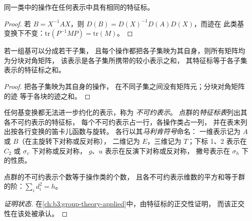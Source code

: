 \begin{proposition}[特征标是类函数]\label{prop:b3:point-groups:class-characters}
同一类中的操作在任何表示中具有相同的特征标。
\end{proposition}

\begin{proof}
若 $B = X^{-1}AX$，则 $D(B) = D(X)^{-1}D(A)D(X)$，而迹在
此类基变换下不变：$\mathrm{tr}(P^{-1}MP) = \mathrm{tr}(M)$。
\end{proof}

\begin{proposition}[按块约化]\label{prop:b3:point-groups:direct-sum}
若一组基可以分成若干子集，
且每个操作都把各子集映为其自身，则所有矩阵均为分块对角矩阵，
该表示是各子集所携带的较小表示之和，
其特征标等于各子集表示的特征标之和。
\end{proposition}

\begin{proof}
把各子集映为其自身的操作，
在不同子集之间没有矩阵元；分块对角矩阵的迹
等于各块的迹之和。
\end{proof}

\begin{definition}\label{def:b3:point-groups:irrep}
任何基变换都无法进一步约化的表示，称为
\emph{不可约表示}。
点群的\emph{特征标表}列出其各不可约表示的特征标，
每个不可约表示占一行，各操作类占一列，
并在表末列出按各行变换的笛卡儿函数与旋转。
各行以其\emph{马利肯符号}命名：
一维表示记为 $A$ 或 $B$（在主旋转下对称或反对称），
二维记为 $E$，三维记为 $T$；下标 1、2 表示在 $C_2$ 或 $\sigma_v$ 下对称或反对称，
$g$、$u$ 表示在反演下对称或反对称，
撇号表示在 $\sigma_h$ 下的性质。
\end{definition}

\begin{proposition}[特征标表的大小]\label{prop:b3:point-groups:irrep-count}
点群的不可约表示个数等于操作类的个数，
且各不可约表示维数的平方和等于群的阶：$\sum_id_i^2 = h$。
\end{proposition}
\begin{proof}[证明状态]
在\cref{ch:b3:group-theory-applied}中，由特征标的正交性证明，
而该正交性在该处被承认。
\end{proof}


